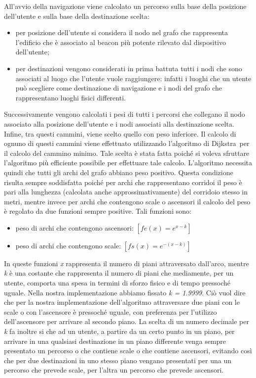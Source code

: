 \documentclass[../SperimentazioniPratiche.tex]{subfiles}
\begin{document}
		All'avvio della navigazione viene calcolato un percorso sulla base della posizione dell'utente e sulla base della destinazione scelta:
		\begin{itemize} 
			\item per posizione dell'utente si considera il nodo nel grafo che rappresenta l'edificio che è associato al beacon più potente rilevato dal dispositivo dell'utente;
			\item per destinazioni vengono considerati in prima battuta tutti i nodi che sono associati al luogo che l'utente vuole raggiungere: infatti i luoghi che un utente può scegliere come destinazione di navigazione e i nodi del grafo che rappresentano luoghi fisici differenti.
		\end{itemize}
		Successivamente vengono calcolati i pesi di tutti i percorsi che collegano il nodo associato alla posizione dell'utente e i nodi associati alla destinazione scelta. Infine, tra questi cammini, viene scelto quello con peso inferiore. Il calcolo di ognuno di questi cammini viene effettuato utilizzando l'algoritmo di Dijkstra\g\ per il calcolo del cammino minimo. Tale scelta è stata fatta poiché si voleva sfruttare l'algoritmo più efficiente possibile per effettuare tale calcolo. L'algoritmo necessita quindi che tutti gli archi del grafo abbiano peso positivo. Questa condizione risulta sempre soddisfatta poiché per archi che rappresentano corridoi il peso è pari alla lunghezza (calcolata anche approssimativamente) del corridoio stesso in metri, mentre invece per archi che contengono scale o ascensori il calcolo del peso è regolato da due funzioni sempre positive. Tali funzioni sono:
		\begin{itemize}
			\item peso di archi che contengono ascensori: $[fe(x) = e^{x-k}]$
			\item peso di archi che contengono scale: $[fs(x) = e^{-(x-k)}]$
		\end{itemize}
		In queste funzioni \textit{x} rappresenta il numero di piani attraversato dall'arco, mentre \textit{k} è una costante che rappresenta il numero di piani che mediamente, per un utente, comporta una spesa in termini di sforzo fisico e di tempo pressoché uguale. Nella nostra implementazione abbiamo fissato \textit{k = 1.9999}. Ciò vuol dire che per la nostra implementazione dell'algoritmo attraversare due piani con le scale o con l'ascensore è pressoché uguale, con preferenza per l'utilizzo dell'ascensore per arrivare al secondo piano.
		La scelta di un numero decimale per \textit{k} fa inoltre si che ad un utente, a partire da un certo punto in un piano, per arrivare in una qualsiasi destinazione in un piano differente venga sempre presentato un percorso o che contiene scale o che contiene ascensori, evitando così che per due destinazioni in uno stesso piano vengano presentati per una un percorso che prevede scale, per l'altra un percorso che prevede ascensori.
		
\end{document}

